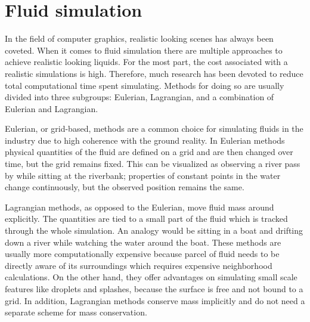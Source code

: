 \documentclass[../../main.tex]{subfiles}
\begin{document}

\section{Fluid simulation}
In the field of computer graphics, realistic looking scenes 
has always been coveted. When it comes to fluid simulation there are multiple approaches to achieve realistic looking liquids. For the most part, the cost associated with a realistic simulations is high. Therefore, much research has been devoted to reduce total computational time spent simulating. Methods for doing so are usually divided into three subgroups: Eulerian, Lagrangian, and a combination of Eulerian and Lagrangian.






Eulerian, or grid-based, methods are a common choice for simulating fluids in the industry due to high coherence with the ground reality. In Eulerian methods physical quantities of the fluid are defined on a grid and are then changed over time, but the grid remains fixed. This can be visualized as observing a river pass by while sitting at the riverbank; properties of constant points in the water change continuously, but the observed position remains the same. 

Lagrangian methods, as opposed to the Eulerian, move fluid mass around explicitly. The quantities are tied to a small part of the fluid which is tracked through the whole simulation. An analogy would be sitting in a boat and drifting down a river while watching the water around the boat. These methods are usually more computationally expensive because parcel of fluid needs to be directly aware of its surroundings which requires expensive neighborhood calculations. On the other hand, they offer advantages on simulating small scale features like droplets and splashes, because the surface is free and not bound to a grid. In addition, Lagrangian methods conserve mass implicitly and do not need a separate scheme for mass conservation. 
\end{document}
